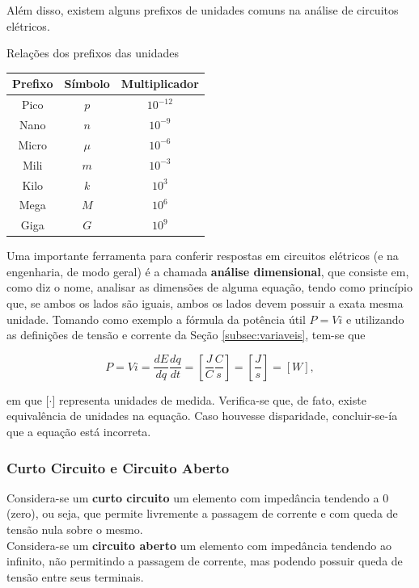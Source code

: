 \documentclass{article}
\numberwithin{equation}{section}
\begin{document}
Além disso, existem alguns prefixos de unidades comuns na análise de circuitos elétricos.

\begin{center}
    Relações dos prefixos das unidades \\
    \begin{tabular}{|c|c|c|} \hline
        Prefixo & Símbolo & Multiplicador \\ \hline
        Pico & $p$ & $10^{-12}$ \\
        Nano & $n$ & $10^{-9}$ \\
        Micro & $\mu$ & $10^{-6}$ \\
        Mili & $m$ & $10^{-3}$ \\
        Kilo & $k$ & $10^{3}$ \\
        Mega & $M$ & $10^{6}$ \\
        Giga & $G$ & $10^{9}$ \\ \hline
    \end{tabular}
\end{center}

Uma importante ferramenta para conferir respostas em circuitos elétricos (e na engenharia, de modo geral) é a chamada \textbf{análise dimensional}, que consiste em, como diz o nome, analisar as dimensões de alguma equação, tendo como princípio que, se ambos os lados são iguais, ambos os lados devem possuir a exata mesma unidade. Tomando como exemplo a fórmula da potência útil $P = Vi$ e utilizando as definições de tensão e corrente da Seção \ref{subsec:variaveis}, tem-se que

\begin{equation}
    P = Vi = \dfrac{dE}{dq} \dfrac{dq}{dt} = \left[\dfrac{J}{C}\dfrac{C}{s}\right] = \left[\dfrac{J}{s}\right] = [W],
\end{equation}

\noindent em que [$\cdot$] representa unidades de medida. Verifica-se que, de fato, existe equivalência de unidades na equação. Caso houvesse disparidade, concluir-se-ía que a equação está incorreta.

\subsubsection{Curto Circuito e Circuito Aberto}
Considera-se um \textbf{curto circuito} um elemento com impedância tendendo a 0 (zero), ou seja, que permite livremente a passagem de corrente e com queda de tensão nula sobre o mesmo. \\
\indent Considera-se um \textbf{circuito aberto} um elemento com impedância tendendo ao infinito, não permitindo a passagem de corrente, mas podendo possuir queda de tensão entre seus terminais.
\end{document}
